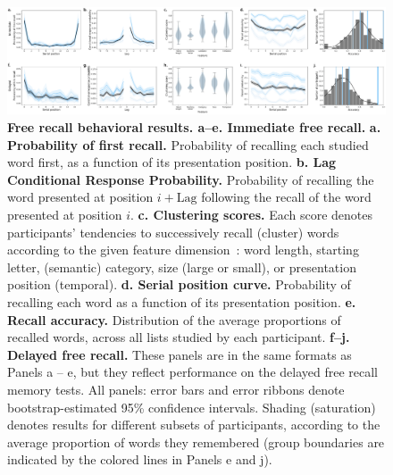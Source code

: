 \documentclass[10pt]{article}
\begin{document}
\begin{figure}
\centering
\includegraphics[width=1\textwidth]{figs/free_recall_behavior}
\caption{\textbf{Free recall behavioral results.  a--e. Immediate free
  recall.}  \textbf{a. Probability of first recall.}  Probability of
recalling each studied word first, as a function of its presentation
position.  \textbf{b. Lag Conditional Response Probability.}
Probability of recalling the word presented at position $i +
\mathrm{Lag}$ following the recall of the word presented at position
$i$.  \textbf{c. Clustering scores.}  Each score denotes participants'
tendencies to successively recall (cluster) words according to the
given feature dimension~\citep{PolyEtal09}: word length, starting letter, (semantic)
category, size (large or small), or presentation position (temporal).
\textbf{d. Serial position curve.}  Probability of recalling each word
as a function of its presentation position.  \textbf{e. Recall
  accuracy.}  Distribution of the average proportions of recalled
words, across all lists studied by each participant.  \textbf{f--j.
  Delayed free recall.}  These panels are in the same formats as
Panels a -- e, but they reflect performance on the delayed free recall
memory tests.  All panels: error bars and error ribbons denote bootstrap-estimated
95\% confidence intervals.  Shading (saturation) denotes results for
different subsets of participants, according to the average
proportion of words they remembered (group boundaries are indicated
by the colored lines in Panels e and j).}
\label{fig:fr_behavioral}
\end{figure}
\end{document}
